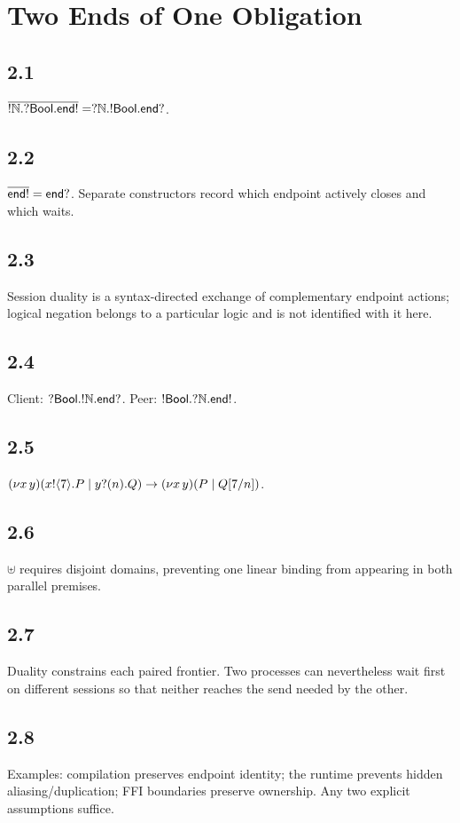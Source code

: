 \chapter{Two Ends of One Obligation}

\section*{2.1}
$\overline{!\mathbb{N}.?\mathsf{Bool}.\mathsf{end!}}=?\mathbb{N}.!\mathsf{Bool}.\mathsf{end?}$.

\section*{2.2}
$\overline{\mathsf{end!}}=\mathsf{end?}$. Separate constructors record which endpoint actively closes and which waits.

\section*{2.3}
Session duality is a syntax-directed exchange of complementary endpoint actions; logical negation belongs to a particular logic and is not identified with it here.

\section*{2.4}
Client: $?\mathsf{Bool}.!\mathbb{N}.\mathsf{end?}$. Peer: $!\mathsf{Bool}.?\mathbb{N}.\mathsf{end!}$.

\section*{2.5}
$(\nu x\,y)(x!\langle 7\rangle.P\mid y?(n).Q)\to(\nu x\,y)(P\mid Q[7/n])$.

\section*{2.6}
$\uplus$ requires disjoint domains, preventing one linear binding from appearing in both parallel premises.

\section*{2.7}
Duality constrains each paired frontier. Two processes can nevertheless wait first on different sessions so that neither reaches the send needed by the other.

\section*{2.8}
Examples: compilation preserves endpoint identity; the runtime prevents hidden aliasing/duplication; FFI boundaries preserve ownership. Any two explicit assumptions suffice.

